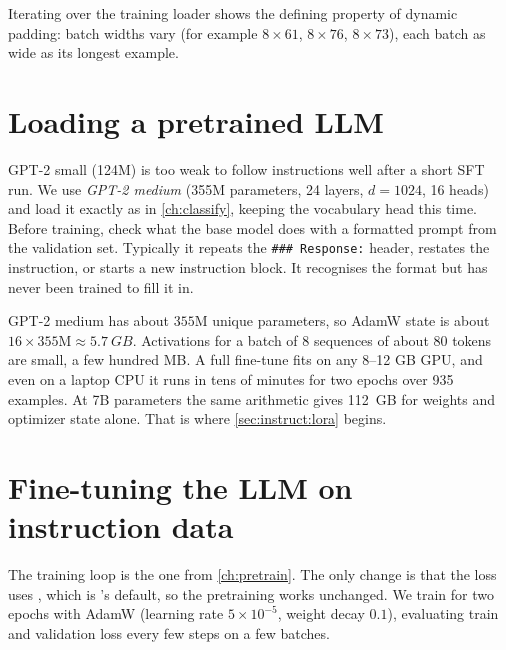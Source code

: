 Iterating over the training loader shows the defining property of dynamic padding:
batch widths vary (for example $8\times61$, $8\times76$, $8\times73$), each batch as
wide as its longest example.

\section{Loading a pretrained LLM}\label{sec:instruct:load}

GPT-2 small (124M) is too weak to follow instructions well after a short SFT run. We
use \emph{GPT-2 medium} (355M parameters, 24 layers, $d=1024$, 16 heads) and load it
exactly as in \cref{ch:classify}, keeping the vocabulary head this time. Before
training, check what the base model does with a formatted prompt from the validation
set. Typically it repeats the \texttt{\#\#\# Response:} header, restates the
instruction, or starts a new instruction block. It recognises the format but has never
been trained to fill it in.

\begin{napkinmath}
GPT-2 medium has about $355$M unique parameters, so AdamW state is about
$16\times355\text{M}\approx\SI{5.7}{GB}$. Activations for a batch of 8 sequences of
about 80 tokens are small, a few hundred MB. A full fine-tune fits on any 8--12 GB GPU,
and even on a laptop CPU it runs in tens of minutes for two epochs over 935 examples.
At 7B parameters the same arithmetic gives \SI{112}{GB} for weights and optimizer state
alone. That is where \cref{sec:instruct:lora} begins.
\end{napkinmath}

\section{Fine-tuning the LLM on instruction data}\label{sec:instruct:train}

The training loop is the one from \cref{ch:pretrain}. The only change is that the loss
uses , which is 's default, so the
pretraining  works unchanged. We train for two
epochs with AdamW (learning rate $5\times10^{-5}$, weight decay $0.1$), evaluating
train and validation loss every few steps on a few batches.

